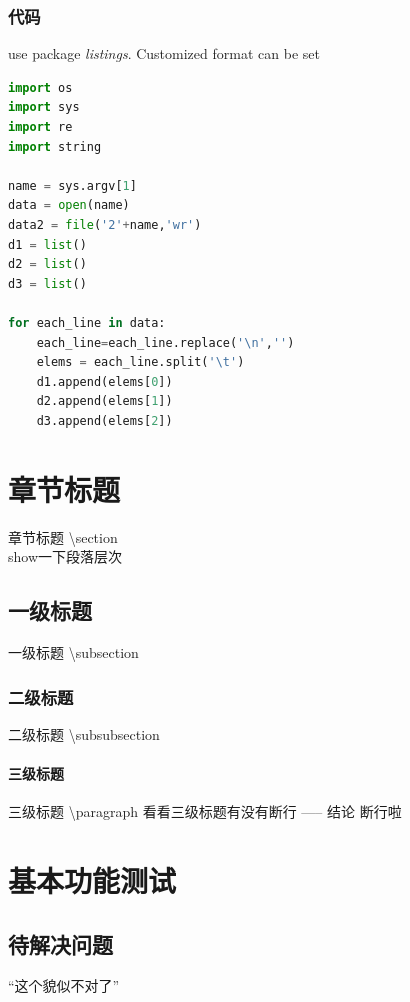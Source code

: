 \subsubsection{代码}
use package \textit{listings}. Customized format can be set
\lstset{basicstyle=\ttfamily\small ,frame=single,captionpos=t}
%
\begin{lstlisting}[language=Python, caption=一段python代码] 
import os
import sys
import re
import string

name = sys.argv[1]
data = open(name)
data2 = file('2'+name,'wr')
d1 = list()
d2 = list()
d3 = list()

for each_line in data:
	each_line=each_line.replace('\n','')
	elems = each_line.split('\t')
	d1.append(elems[0])
	d2.append(elems[1])
	d3.append(elems[2])
\end{lstlisting}



\section{章节标题}
	章节标题 \textbackslash section \\
	show一下段落层次
\subsection{一级标题} 
	一级标题 \textbackslash subsection
	
\subsubsection{二级标题}
	二级标题 \textbackslash subsubsection
	
\paragraph{三级标题}
	三级标题 \textbackslash paragraph
看看三级标题有没有断行 ----- 结论 断行啦\\




\section{基本功能测试}
\subsection{待解决问题}
	``这个貌似不对了''
		

